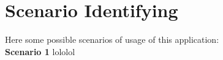 \section{Scenario Identifying}
Here some possible scenarios of usage of this application:\\
\bigbreak
\bigbreak
\textbf{\large Scenario 1}
\bigbreak
lololol